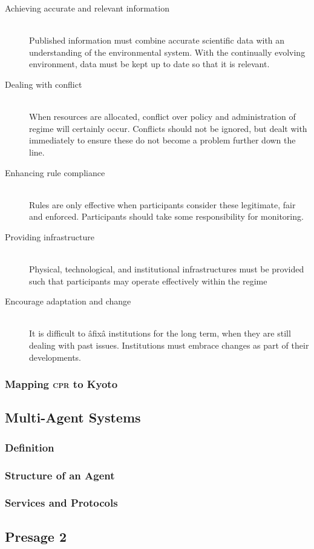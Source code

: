 \begin{description}
	\item[Achieving accurate and relevant information] \hfill \\
	Published information must combine accurate scientific data with an understanding of the environmental system. With the continually evolving environment, data must be kept up to date so that it is relevant. 
	
	\item[Dealing with conflict] \hfill \\
	When resources are allocated, conflict over policy and administration of regime will certainly occur. Conflicts should not be ignored, but dealt with immediately to ensure these do not become a problem further down the line. 

	\item[Enhancing rule compliance] \hfill \\
	Rules are only effective when participants consider these legitimate, fair and enforced. Participants should take some responsibility for monitoring.
	
	\item[Providing infrastructure] \hfill \\
	Physical, technological, and institutional infrastructures must be provided such that participants may operate effectively within the regime
	
	\item[Encourage adaptation and change] \hfill \\
	It is difficult to âfixâ institutions for the long term, when they are still dealing with past issues. Institutions must embrace changes as part of their developments.
\end{description}

\subsubsection{Mapping \textsc{cpr} to Kyoto}

\subsection{Multi-Agent Systems}

\subsubsection{Definition}

\subsubsection{Structure of an Agent}

\subsubsection{Services and Protocols}

\subsection{Presage 2}

